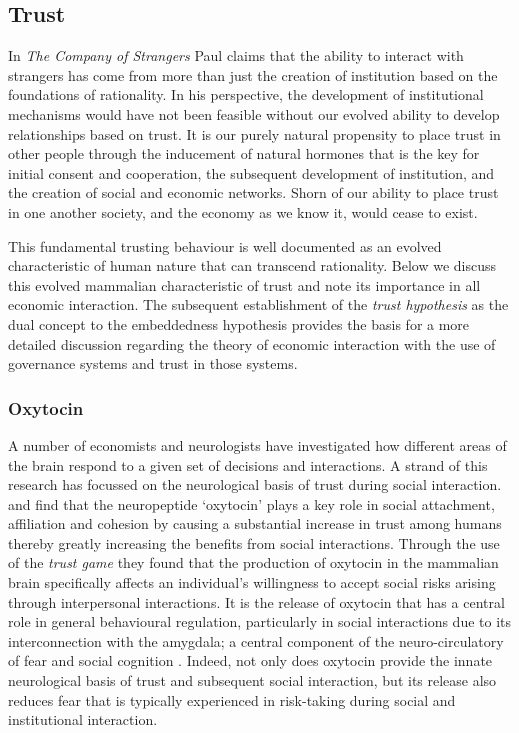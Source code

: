 \begin{subappendices}
\section{Trust}
\label{section:trust}

In \emph{The Company of Strangers} Paul \citet{Seabright2009} claims that the ability to interact with strangers has come from more than just the creation of institution based on the foundations of rationality. In his perspective, the development of institutional mechanisms would have not been feasible without our evolved ability to develop relationships based on trust. It is our purely natural propensity to place trust in other people through the inducement of natural hormones that is the key for initial consent and cooperation, the subsequent development of institution, and the creation of social and economic networks. Shorn of our ability to place trust in one another society, and the economy as we know it, would cease to exist.

This fundamental trusting behaviour is well documented as an evolved characteristic of human nature that can transcend rationality. Below we discuss this evolved mammalian characteristic of trust and note its importance in all economic interaction. The subsequent establishment of the \emph{trust hypothesis} as the dual concept to the embeddedness hypothesis provides the basis for a more detailed discussion regarding the theory of economic interaction with the use of governance systems and trust in those systems.

\subsubsection{Oxytocin}

A number of economists and neurologists have investigated how different areas of the brain respond to a given set of decisions and interactions. A strand of this research has focussed on the neurological basis of trust during social interaction. \citet{Zak2004} and \citet{Kosfeld2005} find that the neuropeptide `oxytocin' plays a key role in social attachment, affiliation and cohesion by causing a substantial increase in trust among humans thereby greatly increasing the benefits from social interactions. Through the use of the \emph{trust game} they found that the production of oxytocin in the mammalian brain specifically affects an individual's willingness to accept social risks arising through interpersonal interactions. It is the release of oxytocin that has a central role in general behavioural regulation, particularly in social interactions due to its interconnection with the amygdala; a central component of the neuro-circulatory of fear and social cognition \citep{Kirsch2005}. Indeed, not only does oxytocin provide the innate neurological basis of trust and subsequent social interaction, but its release also reduces fear that is typically experienced in risk-taking during social and institutional interaction.


\end{subappendices}
